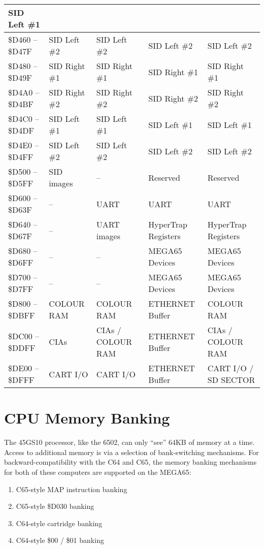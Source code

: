 \begin{longtable}{|p{2.2cm}|C{2cm}|C{2cm}|C{2cm}|C{2cm}|}
SID Left \#1 \\
\hline
\small \$D460 -- \$D47F & \small SID Left \#2 & SID Left \#2 & SID Left \#2 &
SID Left \#2 \\
\hline
\small \$D480 -- \$D49F & \small SID Right \#1 & SID Right \#1 & SID Right \#1 &
SID Right \#1 \\
\hline
\small \$D4A0 -- \$D4BF & \small SID Right \#2 & SID Right \#2 & SID Right \#2 &
SID Right \#2 \\
\hline
\small \$D4C0 -- \$D4DF & \small SID Left \#1 & SID Left \#1 & SID Left \#1 &
SID Left \#1 \\
\hline
\small \$D4E0 -- \$D4FF & \small SID Left \#2 & SID Left \#2 & SID Left \#2 &
SID Left \#2 \\
\hline
\small \$D500 -- \$D5FF & \small SID images & -- & Reserved & Reserved \\
\hline
\small \$D600 -- \$D63F & \small -- & UART & UART & UART \\
\hline
\small \$D640 -- \$D67F & \small -- & UART images & HyperTrap
Registers & HyperTrap Registers \\
\hline
\small \$D680 -- \$D6FF & \small -- & -- & MEGA65 Devices & MEGA65 Devices \\
\hline
\small \$D700 -- \$D7FF & \small -- & -- & MEGA65 Devices & MEGA65 Devices \\
\hline
\small \$D800 -- \$DBFF & \small COLOUR RAM & COLOUR RAM & ETHERNET Buffer & COLOUR RAM \\
\hline
\small \$DC00 -- \$DDFF & \small CIAs & CIAs / COLOUR RAM & ETHERNET Buffer & CIAs / COLOUR RAM \\
\hline
\small \$DE00 -- \$DFFF & \small CART I/O & CART I/O & ETHERNET Buffer & CART I/O / SD SECTOR \\
\hline
\end{longtable}

\section{CPU Memory Banking}
\label{sec:membanking}

The 45GS10 processor, like the 6502, can only ``see'' 64KB of memory
at a time. Access to additional memory is via a selection of
bank-switching mechanisms.  For backward-compatibility with the C64
and C65, the memory banking mechanisms for both of these computers
are supported on the MEGA65:
\begin{enumerate}
\item C65-style MAP instruction banking
\item C65-style \$D030 banking
\item C64-style cartridge banking
\item C64-style \$00 / \$01 banking
\end{enumerate}

